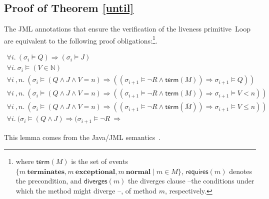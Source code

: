 \subsection{Proof of Theorem  \ref{until}}
\label{sec-proof-theorem-loop}

\begin{lemma}
\label{lemma-loop}
The JML annotations that ensure the verification of the liveness
primitive~\textsf{Loop} are equivalent to the following 
proof obligations:\:\footnote{where
\(\mathsf{term}(M)\) is the set of events 
\(\{ m~\mathbf{terminates}, m~\mathbf{exceptional}, m~\mathbf{normal} \mid m \in M\}\), 
\(\mathsf{requires}(m)\)  denotes the precondition, and
\(\mathsf{diverges}(m)\) the diverges
clause --the conditions under which the method might
diverge --, of method \(m\), respectively.}.


\begin{footnotesize}
\begin{gather}
\forall i.\:(\sigma_i \models  Q ) \Rightarrow ( \sigma_i \models J ) \\
\forall i.\:\sigma_i \models (V \in \mathbb{N})\\
\forall i\:, n.\:(\sigma_i \models  (Q \wedge J \wedge V = n) \Rightarrow
((\sigma_{i+1} \models \neg  R \wedge \mathsf{term}(M))
\Rightarrow \sigma_{i+1} \models Q))\\
\forall i\:, n.\:(\sigma_i \models  (Q \wedge J \wedge V = n) \Rightarrow
((\sigma_{i+1} \models \neg  R \wedge \mathsf{term}(M))
\Rightarrow \sigma_{i+1} \models V < n))\\
\forall i\:, n.\:(\sigma_i \models  (Q \wedge J \wedge V = n)
\Rightarrow
((\sigma_{i+1} \models \neg  R \wedge \mathsf{term}(\overline{M})) 
\Rightarrow \sigma_{i+1} \models V \leq n))\\
\forall i.\:(\sigma_i \models (Q \wedge J) 
\Rightarrow (\sigma_{i+1} \models \neg  R ~ \Rightarrow  
\end{gather}
\end{footnotesize}
\end{lemma}

This lemma comes from the Java/JML semantics~\cite{TheseMarieke}.


